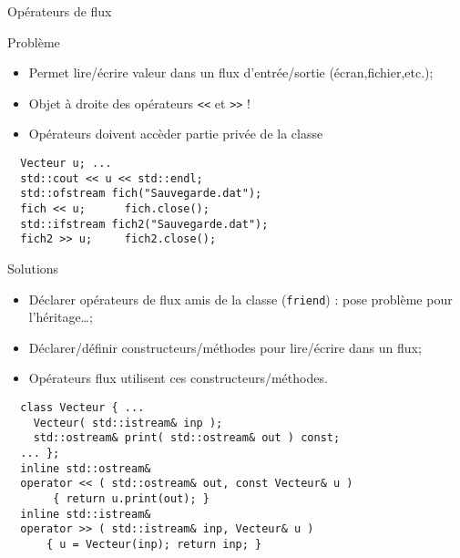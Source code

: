 \documentclass[compress,10pt,aspectratio=169]{beamer}
\begin{document}
  \begin{frame}[fragile]{Opérateurs de flux}
  \scriptsize
  \begin{minipage}{0.49\textwidth}
  \begin{block}{\small Problème}
  \begin{itemize}
    \item Permet lire/écrire valeur dans un flux d'entrée/sortie (écran,fichier,etc.);
    \item Objet à droite des opérateurs \texttt{<<} et \texttt{>>} !
    \item Opérateurs doivent accèder partie privée de la classe
    \end{itemize}
    \end{block}
  \begin{verbatim}
  Vecteur u; ...
  std::cout << u << std::endl;
  std::ofstream fich("Sauvegarde.dat");
  fich << u;      fich.close();
  std::ifstream fich2("Sauvegarde.dat");
  fich2 >> u;     fich2.close();
  \end{verbatim}
      \end{minipage}  
    \begin{minipage}{0.49\textwidth}
      \begin{exampleblock}{\small Solutions}
    \begin{itemize}
    \item Déclarer opérateurs de flux amis de la classe (\texttt{friend}) : pose problème pour l'héritage\ldots;
    \item Déclarer/définir constructeurs/méthodes pour lire/écrire dans un flux;
    \item Opérateurs flux utilisent ces constructeurs/méthodes.
    \end{itemize}
    \end{exampleblock}
    \begin{verbatim}
  class Vecteur { ...
    Vecteur( std::istream& inp );
    std::ostream& print( std::ostream& out ) const;
  ... };
  inline std::ostream& 
  operator << ( std::ostream& out, const Vecteur& u ) 
       { return u.print(out); }
  inline std::istream& 
  operator >> ( std::istream& inp, Vecteur& u )
      { u = Vecteur(inp); return inp; }    
  \end{verbatim}
  \end{minipage}  
  \end{frame}
\end{document}
